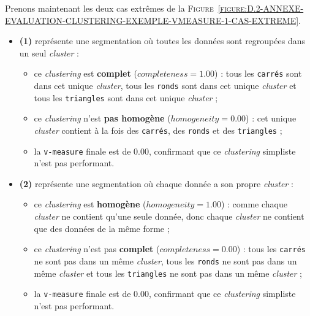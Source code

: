 		Prenons maintenant les deux cas extrêmes de la \textsc{Figure~\ref{figure:D.2-ANNEXE-EVALUATION-CLUSTERING-EXEMPLE-VMEASURE-1-CAS-EXTREME}}.
		\begin{itemize}
			\item \textbf{(1)} représente une segmentation où toutes les données sont regroupées dans un seul \textit{cluster} :
			\begin{itemize}
				\item ce \textit{clustering} est \textbf{complet} ($completeness=1.00$) : tous les \texttt{carrés} sont dans cet unique \textit{cluster}, tous les \texttt{ronds} sont dans cet unique \textit{cluster} et tous les \texttt{triangles} sont dans cet unique \textit{cluster} ;
				\item ce \textit{clustering} n'est \textbf{pas homogène} ($homogeneity=0.00$) : cet unique \textit{cluster} contient à la fois des \texttt{carrés}, des \texttt{ronds} et des \texttt{triangles} ;
				\item la \texttt{v-measure} finale est de $0.00$, confirmant que ce \textit{clustering} simpliste n'est pas performant.
			\end{itemize}
			\item \textbf{(2)} représente une segmentation où chaque donnée a son propre \textit{cluster} :
			\begin{itemize}
				\item ce \textit{clustering} est \textbf{homogène} ($homogeneity=1.00$) : comme chaque \textit{cluster} ne contient qu'une seule donnée, donc chaque \textit{cluster} ne contient que des données de la même forme ;
				\item ce \textit{clustering} n'est pas \textbf{complet} ($completeness=0.00$) : tous les \texttt{carrés} ne sont pas dans un même \textit{cluster}, tous les \texttt{ronds} ne sont pas dans un même \textit{cluster} et tous les \texttt{triangles} ne sont pas dans un même \textit{cluster} ;
				\item la \texttt{v-measure} finale est de $0.00$, confirmant que ce \textit{clustering} simpliste n'est pas performant.
			\end{itemize}
		\end{itemize}
	
